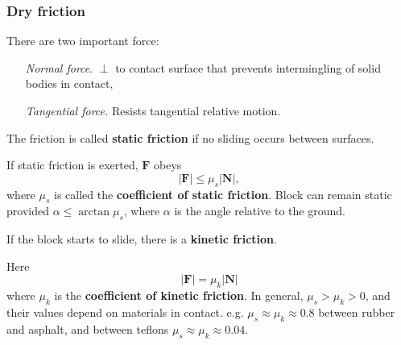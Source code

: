 \subsubsection*{Dry friction}
There are two important force:
\begin{enumerate}[align=left]
    \item[\textit{Normal force}.] $ \perp $ to contact surface that prevents intermingling of solid bodies in contact,
    \item[\textit{Tangential force.}] Resists tangential relative motion. 
\end{enumerate}
\begin{center}
\end{center}

\begin{definition}
    The friction is called \textbf{static friction} if no sliding occurs between surfaces.
\end{definition}

If static friction is exerted, $\mathbf{F}$ obeys 
\[
    |\mathbf{F}|\le \mu_s|\mathbf{N}|,
\]
where $\mu_s$ is called the \textbf{coefficient of static friction}. Block can remain static provided $ \alpha\le \arctan \mu_s $, where $ \alpha $ is the angle relative to the ground.

\begin{definition}
    If the block starts to slide, there is a \textbf{kinetic friction}.
\end{definition}
Here
\[
    |\mathbf{F}| = \mu_k|\mathbf{N}|
\]
where $ \mu_k $ is the \textbf{coefficient of kinetic friction}. In general, $ \mu_s>\mu_k>0 $, and their values depend on materials in contact. e.g. $ \mu_s\approx \mu_k\approx 0.8 $ between rubber and asphalt, and between teflons $ \mu_s\approx \mu_k\approx 0.04 $.


